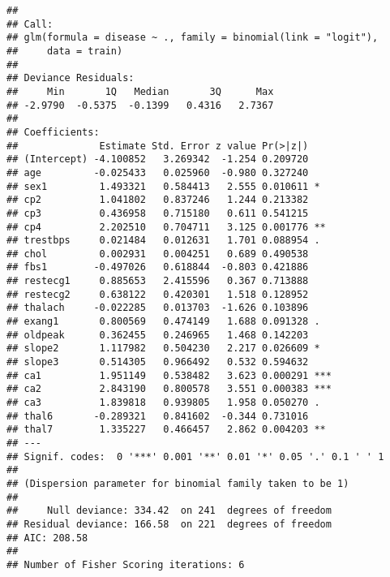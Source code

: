 \documentclass[12,]{article}
\newenvironment{Shaded}{\begin{snugshade}}{\end{snugshade}}
\newcommand{\DataTypeTok}[1]{\textcolor[rgb]{0.13,0.29,0.53}{#1}}
\newcommand{\DecValTok}[1]{\textcolor[rgb]{0.00,0.00,0.81}{#1}}
\newcommand{\KeywordTok}[1]{\textcolor[rgb]{0.13,0.29,0.53}{\textbf{#1}}}
\newcommand{\NormalTok}[1]{#1}
\newcommand{\OperatorTok}[1]{\textcolor[rgb]{0.81,0.36,0.00}{\textbf{#1}}}
\newcommand{\StringTok}[1]{\textcolor[rgb]{0.31,0.60,0.02}{#1}}
\begin{document}
\begin{Shaded}
\end{Shaded}

\begin{verbatim}
## 
## Call:
## glm(formula = disease ~ ., family = binomial(link = "logit"), 
##     data = train)
## 
## Deviance Residuals: 
##     Min       1Q   Median       3Q      Max  
## -2.9790  -0.5375  -0.1399   0.4316   2.7367  
## 
## Coefficients:
##              Estimate Std. Error z value Pr(>|z|)    
## (Intercept) -4.100852   3.269342  -1.254 0.209720    
## age         -0.025433   0.025960  -0.980 0.327240    
## sex1         1.493321   0.584413   2.555 0.010611 *  
## cp2          1.041802   0.837246   1.244 0.213382    
## cp3          0.436958   0.715180   0.611 0.541215    
## cp4          2.202510   0.704711   3.125 0.001776 ** 
## trestbps     0.021484   0.012631   1.701 0.088954 .  
## chol         0.002931   0.004251   0.689 0.490538    
## fbs1        -0.497026   0.618844  -0.803 0.421886    
## restecg1     0.885653   2.415596   0.367 0.713888    
## restecg2     0.638122   0.420301   1.518 0.128952    
## thalach     -0.022285   0.013703  -1.626 0.103896    
## exang1       0.800569   0.474149   1.688 0.091328 .  
## oldpeak      0.362455   0.246965   1.468 0.142203    
## slope2       1.117982   0.504230   2.217 0.026609 *  
## slope3       0.514305   0.966492   0.532 0.594632    
## ca1          1.951149   0.538482   3.623 0.000291 ***
## ca2          2.843190   0.800578   3.551 0.000383 ***
## ca3          1.839818   0.939805   1.958 0.050270 .  
## thal6       -0.289321   0.841602  -0.344 0.731016    
## thal7        1.335227   0.466457   2.862 0.004203 ** 
## ---
## Signif. codes:  0 '***' 0.001 '**' 0.01 '*' 0.05 '.' 0.1 ' ' 1
## 
## (Dispersion parameter for binomial family taken to be 1)
## 
##     Null deviance: 334.42  on 241  degrees of freedom
## Residual deviance: 166.58  on 221  degrees of freedom
## AIC: 208.58
## 
## Number of Fisher Scoring iterations: 6
\end{verbatim}
\end{document}
